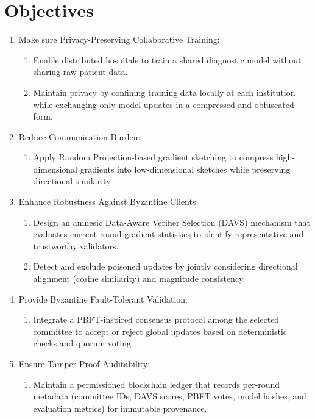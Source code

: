 \section{Objectives}
 \begin{enumerate}
  \item Make sure Privacy-Preserving Collaborative Training:
  \begin{enumerate}
    \item Enable distributed hospitals to train a shared diagnostic model without sharing raw patient data.
    \item Maintain privacy by confining training data locally at each institution while exchanging only model updates in a compressed and obfuscated form.
  \end{enumerate}
  
  \item Reduce Communication Burden:
  \begin{enumerate}
    \item Apply Random Projection-based gradient sketching to compress high-dimensional gradients into low-dimensional sketches while preserving directional similarity.
  \end{enumerate}
  
  \item Enhance Robustness Against Byzantine Clients:
  \begin{enumerate}
    \item Design an amnesic Data-Aware Verifier Selection (DAVS) mechanism that evaluates current-round gradient statistics to identify representative and trustworthy validators.
    \item Detect and exclude poisoned updates by jointly considering directional alignment (cosine similarity) and magnitude consistency.
  \end{enumerate}
  
  \item Provide Byzantine Fault-Tolerant Validation:
  \begin{enumerate}
    \item Integrate a PBFT-inspired consensus protocol among the selected committee to accept or reject global updates based on deterministic checks and quorum voting.
  \end{enumerate}
  
  \item Ensure Tamper-Proof Auditability:
  \begin{enumerate}
    \item Maintain a permissioned blockchain ledger that records per-round metadata (committee IDs, DAVS scores, PBFT votes, model hashes, and evaluation metrics) for immutable provenance.
  \end{enumerate}
  

\end{enumerate}
